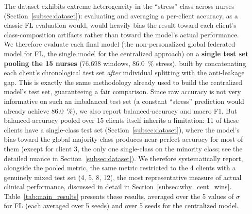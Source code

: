 \documentclass{article}
\begin{document}
The dataset exhibits extreme heterogeneity in the ``stress'' class across nurses
(Section~\ref{subsec:dataset}): evaluating and averaging a per-client accuracy, as
a classic FL evaluation would, would heavily bias the result toward each client's
class-composition artifacts rather than toward the model's actual performance. We
therefore evaluate each final model (the non-personalized global federated model
for FL, the single model for the centralized approach) on a \textbf{single test
set pooling the 15 nurses} (76,698 windows, 86.0~\% stress), built by
concatenating each client's chronological test set \emph{after} individual
splitting with the anti-leakage gap. This is exactly the same methodology already
used to build the centralized model's test set, guaranteeing a fair comparison.
Since raw accuracy is not very informative on such an imbalanced test set (a
constant ``stress'' prediction would already achieve 86.0~\%), we also report
balanced-accuracy and macro F1. But balanced-accuracy pooled over 15 clients
itself inherits a limitation: 11 of these clients have a single-class test set
(Section~\ref{subsec:dataset}), where the model's bias toward the global majority
class produces near-perfect accuracy for most of them (except for client 3, the
only one single-class on the minority class; see the detailed nuance in
Section~\ref{subsec:dataset}). We therefore systematically report, alongside the
pooled metric, the same metric restricted to the 4 clients with a genuinely mixed
test set (4, 5, 8, 12), the most representative measure of actual clinical
performance, discussed in detail in Section~\ref{subsec:why_cent_wins}.
Table~\ref{tab:main_results} presents these results, averaged over the 5 values of
$\sigma$ for FL (each averaged over 5 seeds) and over 5 seeds for the centralized
model.
\end{document}
